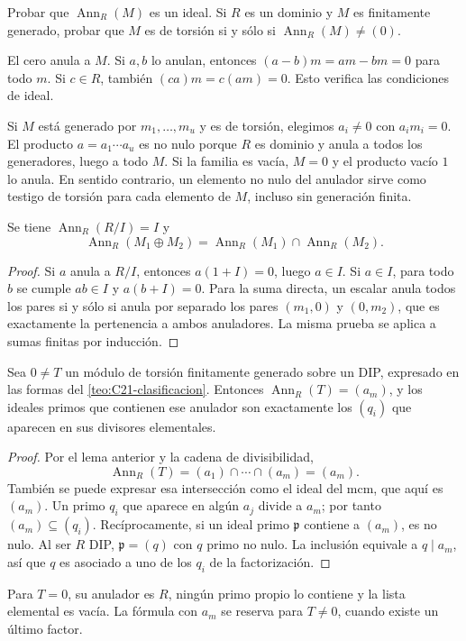 \begin{ejer}\label{ejer:C21-anulador}
Probar que $\operatorname{Ann}_R(M)$ es un ideal. Si $R$ es un dominio y $M$ es finitamente generado, probar que $M$ es de torsión si y sólo si $\operatorname{Ann}_R(M)\ne(0)$.
\end{ejer}
\begin{sol}
El cero anula a $M$. Si $a,b$ lo anulan, entonces $(a-b)m=am-bm=0$ para todo $m$. Si $c\in R$, también $(ca)m=c(am)=0$. Esto verifica las condiciones de ideal.

Si $M$ está generado por $m_1,\ldots,m_u$ y es de torsión, elegimos $a_i\ne0$ con $a_im_i=0$. El producto $a=a_1\cdots a_u$ es no nulo porque $R$ es dominio y anula a todos los generadores, luego a todo $M$. Si la familia es vacía, $M=0$ y el producto vacío $1$ lo anula. En sentido contrario, un elemento no nulo del anulador sirve como testigo de torsión para cada elemento de $M$, incluso sin generación finita.
\end{sol}

\begin{lema}\label{lema:C21-anuladores}
Se tiene $\operatorname{Ann}_R(R/I)=I$ y
\[
\operatorname{Ann}_R(M_1\oplus M_2)
=\operatorname{Ann}_R(M_1)\cap\operatorname{Ann}_R(M_2).
\]
\end{lema}
\begin{proof}
Si $a$ anula a $R/I$, entonces $a(1+I)=0$, luego $a\in I$. Si $a\in I$, para todo $b$ se cumple $ab\in I$ y $a(b+I)=0$. Para la suma directa, un escalar anula todos los pares si y sólo si anula por separado los pares $(m_1,0)$ y $(0,m_2)$, que es exactamente la pertenencia a ambos anuladores. La misma prueba se aplica a sumas finitas por inducción.
\end{proof}

\begin{lema}\label{lema:C21-primos-anulador}
Sea $0\ne T$ un módulo de torsión finitamente generado sobre un DIP, expresado en las formas del \cref{teo:C21-clasificacion}. Entonces $\operatorname{Ann}_R(T)=(a_m)$, y los ideales primos que contienen ese anulador son exactamente los $(q_i)$ que aparecen en sus divisores elementales.
\end{lema}
\begin{proof}
Por el lema anterior y la cadena de divisibilidad,
\[
\operatorname{Ann}_R(T)=(a_1)\cap\cdots\cap(a_m)=(a_m).
\]
También se puede expresar esa intersección como el ideal del mcm, que aquí es $(a_m)$. Un primo $q_i$ que aparece en algún $a_j$ divide a $a_m$; por tanto $(a_m)\subseteq(q_i)$. Recíprocamente, si un ideal primo $\mathfrak p$ contiene a $(a_m)$, es no nulo. Al ser $R$ DIP, $\mathfrak p=(q)$ con $q$ primo no nulo. La inclusión equivale a $q\mid a_m$, así que $q$ es asociado a uno de los $q_i$ de la factorización.
\end{proof}
Para $T=0$, su anulador es $R$, ningún primo propio lo contiene y la lista elemental es vacía. La fórmula con $a_m$ se reserva para $T\ne0$, cuando existe un último factor.


